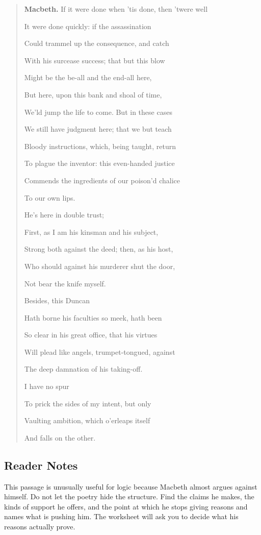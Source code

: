 \documentclass[12pt]{article}
\newenvironment{playpassage}{\begin{quote}\small\setlength{\parskip}{0.25em}}{\end{quote}}
\newcommand{\speaker}[1]{\textbf{#1.}}
\begin{document}
\begin{playpassage}
\speaker{Macbeth} If it were done when 'tis done, then 'twere well\par
It were done quickly: if the assassination\par
Could trammel up the consequence, and catch\par
With his surcease success; that but this blow\par
Might be the be-all and the end-all here,\par
But here, upon this bank and shoal of time,\par
We'ld jump the life to come. But in these cases\par
We still have judgment here; that we but teach\par
Bloody instructions, which, being taught, return\par
To plague the inventor: this even-handed justice\par
Commends the ingredients of our poison'd chalice\par
To our own lips.

He's here in double trust;\par
First, as I am his kinsman and his subject,\par
Strong both against the deed; then, as his host,\par
Who should against his murderer shut the door,\par
Not bear the knife myself.

Besides, this Duncan\par
Hath borne his faculties so meek, hath been\par
So clear in his great office, that his virtues\par
Will plead like angels, trumpet-tongued, against\par
The deep damnation of his taking-off.

I have no spur\par
To prick the sides of my intent, but only\par
Vaulting ambition, which o'erleaps itself\par
And falls on the other.
\end{playpassage}

\subsection*{Reader Notes}

This passage is unusually useful for logic because Macbeth almost argues against himself. Do not let the poetry hide the structure. Find the claims he makes, the kinds of support he offers, and the point at which he stops giving reasons and names what is pushing him. The worksheet will ask you to decide what his reasons actually prove.
\end{document}
